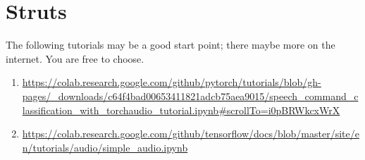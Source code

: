 \documentclass[11pt]{article}
\begin{document}
\section{Struts}
\label{sec:orgb9662c6}
The following tutorials may be a good start point;
there maybe more on the internet.  You are free to
choose.
\begin{enumerate}
\item \url{https://colab.research.google.com/github/pytorch/tutorials/blob/gh-pages/\_downloads/c64f4bad00653411821adcb75aea9015/speech\_command\_classification\_with\_torchaudio\_tutorial.ipynb\#scrollTo=i0pBRWkcxWrX}
\item \url{https://colab.research.google.com/github/tensorflow/docs/blob/master/site/en/tutorials/audio/simple\_audio.ipynb}
\end{enumerate}
\end{document}
